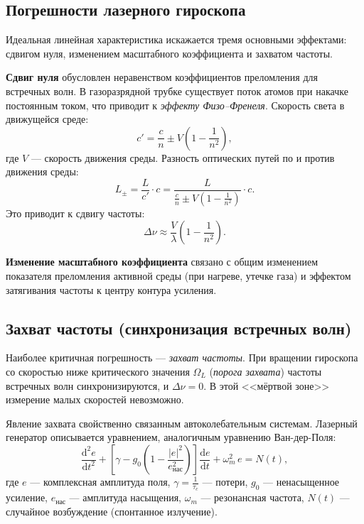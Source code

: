 \documentclass[12pt, a4paper]{article}
\newcommand{\diff}{\mathrm{d}}
\begin{document}
\subsection*{Погрешности лазерного гироскопа}
Идеальная линейная характеристика искажается тремя основными эффектами: сдвигом нуля, изменением масштабного коэффициента и захватом частоты.

\textbf{Сдвиг нуля} обусловлен неравенством коэффициентов преломления для встречных волн. В газоразрядной трубке существует поток атомов при накачке постоянным током, что приводит к \textit{эффекту Физо--Френеля}. Скорость света в движущейся среде:
\begin{equation}
    c' = \frac{c}{n} \pm V\left(1 - \frac{1}{n^2}\right),
\end{equation}
где $V$ --- скорость движения среды. Разность оптических путей по и против движения среды:
\begin{equation}
    L_{\pm} = \frac{L}{c'} \cdot c = \frac{L}{\frac{c}{n} \pm V\left(1 - \frac{1}{n^2}\right)} \cdot c.
\end{equation}
Это приводит к сдвигу частоты:
\begin{equation}
    \Delta \nu \approx \frac{V}{\lambda}\left(1 - \frac{1}{n^2}\right).
\end{equation}

\textbf{Изменение масштабного коэффициента} связано с общим изменением показателя преломления активной среды (при нагреве, утечке газа) и эффектом затягивания частоты к центру контура усиления.

\subsection*{Захват частоты (синхронизация встречных волн)}
Наиболее критичная погрешность --- \textit{захват частоты}. При вращении гироскопа со скоростью ниже критического значения $\Omega_L$ (\textit{порога захвата}) частоты встречных волн синхронизируются, и $\Delta \nu = 0$. В этой <<мёртвой зоне>> измерение малых скоростей невозможно.

Явление захвата свойственно связанным автоколебательным системам. Лазерный генератор описывается уравнением, аналогичным уравнению Ван-дер-Поля:
\begin{equation}
    \frac{\diff^2 e}{\diff t^2} + \left[\gamma - g_0\left(1 - \frac{|e|^2}{e_{\text{нас}}^2}\right)\right]\frac{\diff e}{\diff t} + \omega_m^2\, e = N(t),
\end{equation}
где $e$ --- комплексная амплитуда поля, $\gamma = \frac{1}{\tau_c}$ --- потери, $g_0$ --- ненасыщенное усиление, $e_{\text{нас}}$ --- амплитуда насыщения, $\omega_m$ --- резонансная частота, $N(t)$ --- случайное возбуждение (спонтанное излучение).
\end{document}
